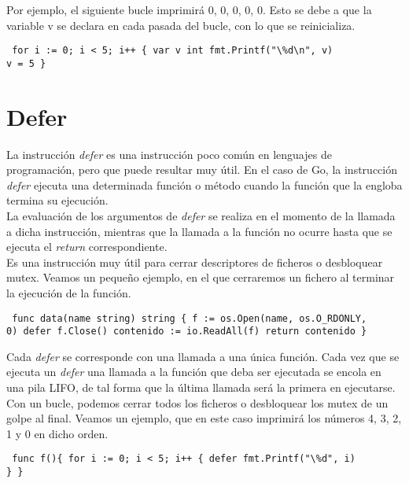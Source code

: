 Por ejemplo, el siguiente bucle imprimirá 0, 0, 0, 0, 0. Esto se debe a que la
variable v se declara en cada pasada del bucle, con lo que se reinicializa.

\begin{verbatim} for i := 0; i < 5; i++ { var v int fmt.Printf("\%d\n", v)
v = 5 } \end{verbatim}

\section{Defer}

La instrucción \textit{defer} es una instrucción poco común en lenguajes de
programación, pero que puede resultar muy útil. En el caso de Go, la instrucción
\textit{defer} ejecuta una determinada función o método cuando la función que la
engloba termina su ejecución.\\

La evaluación de los argumentos de \textit{defer} se realiza en el momento de la
llamada a dicha instrucción, mientras que la llamada a la función no ocurre
hasta que se ejecuta el \textit{return} correspondiente.\\

Es una instrucción muy útil para cerrar descriptores de ficheros o desbloquear
mutex. Veamos un pequeño ejemplo, en el que cerraremos un fichero al terminar la
ejecución de la función.

\begin{verbatim} func data(name string) string { f := os.Open(name, os.O_RDONLY,
0) defer f.Close() contenido := io.ReadAll(f) return contenido } \end{verbatim}

Cada \textit{defer} se corresponde con una llamada a una única función. Cada vez
que se ejecuta un \textit{defer} una llamada a la función que deba ser ejecutada
se encola en una pila LIFO, de tal forma que la última llamada será la primera
en ejecutarse. Con un bucle, podemos cerrar todos los ficheros o desbloquear los
mutex de un golpe al final. Veamos un ejemplo, que en este caso imprimirá los
números 4, 3, 2, 1 y 0 en dicho orden.

\begin{verbatim} func f(){ for i := 0; i < 5; i++ { defer fmt.Printf("\%d", i)
} } \end{verbatim}

